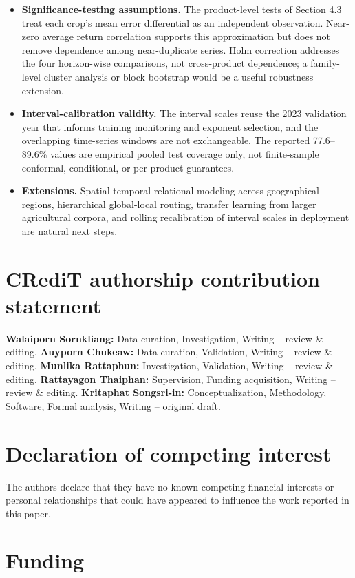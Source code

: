\documentclass[review,3p,times]{elsarticle}
\begin{document}
\begin{itemize}
\item \textbf{Significance-testing assumptions.} The product-level tests of Section 4.3 treat each crop's mean error differential as an independent observation. Near-zero average return correlation supports this approximation but does not remove dependence among near-duplicate series. Holm correction addresses the four horizon-wise comparisons, not cross-product dependence; a family-level cluster analysis or block bootstrap would be a useful robustness extension.
\item \textbf{Interval-calibration validity.} The interval scales reuse the 2023 validation year that informs training monitoring and exponent selection, and the overlapping time-series windows are not exchangeable. The reported 77.6--89.6\% values are empirical pooled test coverage only, not finite-sample conformal, conditional, or per-product guarantees.
\item \textbf{Extensions.} Spatial-temporal relational modeling across geographical regions, hierarchical global-local routing, transfer learning from larger agricultural corpora, and rolling recalibration of interval scales in deployment are natural next steps.


\end{itemize}

\section*{CRediT authorship contribution statement}

\textbf{Walaiporn Sornkliang:} Data curation, Investigation, Writing -- review \& editing. \textbf{Auyporn Chukeaw:} Data curation, Validation, Writing -- review \& editing. \textbf{Munlika Rattaphun:} Investigation, Validation, Writing -- review \& editing. \textbf{Rattayagon Thaiphan:} Supervision, Funding acquisition, Writing -- review \& editing. \textbf{Kritaphat Songsri-in:} Conceptualization, Methodology, Software, Formal analysis, Writing -- original draft.

\section*{Declaration of competing interest}

The authors declare that they have no known competing financial interests or personal relationships that could have appeared to influence the work reported in this paper.

\section*{Funding}
\end{document}
